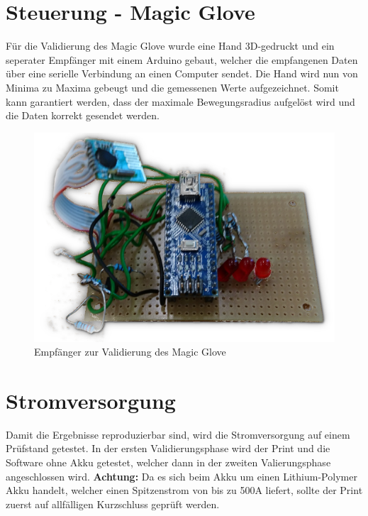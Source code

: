 \section{Steuerung - Magic Glove} \label{ValidSteuerMagicGlove}
Für die Validierung des Magic Glove wurde eine Hand 3D-gedruckt und ein seperater Empfänger mit einem Arduino gebaut, welcher die empfangenen Daten über eine serielle Verbindung an einen Computer sendet. Die Hand wird nun von Minima zu Maxima gebeugt und die gemessenen Werte aufgezeichnet. Somit kann garantiert werden, dass der maximale Bewegungsradius aufgelöst wird und die Daten korrekt gesendet werden.
\begin{figure} [H]
	\centering
	\includegraphics[scale=0.2]{images/receiver}
	\caption{Empfänger zur Validierung des Magic Glove}
	\label{fig:statediagrammbatteri}
\end{figure}
\section{Stromversorgung} \label{ValidStromversorgung}

Damit die Ergebnisse reproduzierbar sind, wird die Stromversorgung auf einem Prüfstand getestet. In der ersten Validierungsphase wird der Print und die Software ohne Akku getestet, welcher dann in der zweiten Valierungsphase angeschlossen wird. \textbf{Achtung:} Da es sich beim Akku um einen Lithium-Polymer Akku handelt, welcher einen Spitzenstrom von bis zu 500A liefert, sollte der Print zuerst auf allfälligen Kurzschluss geprüft werden.   

